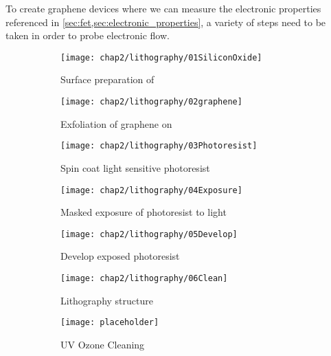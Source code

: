 \documentclass[../../Matt_Gebert_Honours_Thesis.tex]{subfiles}
\begin{document}
	To create graphene devices where we can measure the electronic properties referenced in \cref{sec:fet,sec:electronic_properties}, a variety of steps need to be taken in order to probe electronic flow.
	
	\begin{figure}[H]
	\centering
	\begin{subfigure}{0.2\textwidth}
		\centering
		\texttt{[image: chap2/lithography/01SiliconOxide]}
		\caption{Surface preparation of \silicondioxide}
	\end{subfigure}
	\hspace{0.04\textwidth}
	\begin{subfigure}{0.2\textwidth}
		\centering
		\texttt{[image: chap2/lithography/02graphene]}
		\caption{Exfoliation of graphene on \silicondioxide}
	\end{subfigure}
	\hspace{0.04\textwidth}
	\begin{subfigure}{0.2\textwidth}
		\centering
		\texttt{[image: chap2/lithography/03Photoresist]}
		\caption{Spin coat light sensitive photoresist}
	\end{subfigure}
	\hspace{0.04\textwidth}
	\begin{subfigure}{0.2\textwidth}
		\centering
		\texttt{[image: chap2/lithography/04Exposure]}
		\caption{Masked exposure of photoresist to light}
	\end{subfigure}
	\hspace{0.04\textwidth}
	\begin{subfigure}{0.2\textwidth}
		\centering
		\texttt{[image: chap2/lithography/05Develop]}
		\caption{Develop exposed photoresist}
	\end{subfigure}
	\hspace{0.04\textwidth}
	\begin{subfigure}{0.2\textwidth}
		\centering
		\texttt{[image: chap2/lithography/06Clean]}
		\caption{Lithography structure}
	\end{subfigure}
	\hspace{0.04\textwidth}
	\begin{subfigure}{0.2\textwidth}
		\centering
		\texttt{[image: placeholder]}
		\caption{UV Ozone Cleaning}
	\end{subfigure}
	\hspace{0.04\textwidth}
	\begin{subfigure}{0.2\textwidth}

\end{subfigure}
\end{figure}
\end{document}
